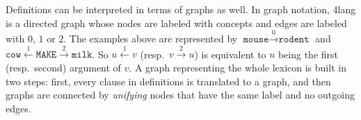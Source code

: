 \documentclass[a4paper,10pt]{article}
\begin{document}
Definitions can be interpreted in terms of graphs as well. In graph notation, 4lang is a directed graph whose nodes are labeled with concepts and edges are labeled with $0$, $1$ or $2$. The examples above are represented by $\texttt{mouse}\xrightarrow{0}\texttt{rodent}$ and $\texttt{cow}\xleftarrow{1}\texttt{MAKE}\xrightarrow{2}\texttt{milk}$. So $u\xleftarrow{1}v$ (resp.\ $v\xrightarrow 2 u$) is equivalent to $u$ being the first (resp.\ second) argument of $v$.
A graph representing the whole lexicon is built in two steps: first, every clause in definitions is translated to a graph, and then graphs are connected by \emph{unifying} nodes that have the same label and no outgoing edges.

\end{document}

